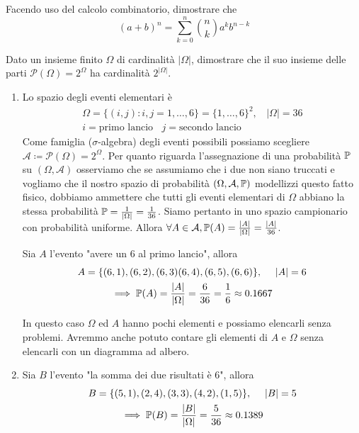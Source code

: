 \Esercizio{}

Facendo uso del calcolo combinatorio, dimostrare che
\begin{equation*}
	(a+b)^{n} =\sum\limits _{k=0}^{n}\binom{n}{k} a^{k} b^{n-k}
\end{equation*}

\Esercizio{}

Dato un insieme finito $\Omega $ di cardinalità $| \Omega | $, dimostrare che il suo insieme delle parti $\mathcal{P}(\Omega) =2^{\Omega }$ ha cardinalità $2^{| \Omega | }$.

\ParteSoluzioni

\Soluzione

\begin{enumerate}
	\item Lo spazio degli eventi elementari è
	\begin{gather*}
		\Omega =\{(i,j) :i,j=1,\dots ,6\} =\{1,\dots ,6\}^{2} ,\ \ \ \ | \Omega | =36\\
		i=\text{primo lancio} \ \ \ \ j=\text{secondo lancio}
	\end{gather*}
	Come famiglia ($\sigma $-algebra) degli eventi possibili possiamo scegliere $\mathcal{A} \coloneqq \mathcal{P}(\Omega) =2^{\Omega }$. Per quanto riguarda l'assegnazione di una probabilità $\mathbb{P}$ su $(\Omega ,\mathcal{A})$ osserviamo che se assumiamo che i due non siano truccati e vogliamo che il nostro spazio di probabilità $(\Omega ,\mathcal{A} ,\mathbb{P})$ modellizzi questo fatto fisico, dobbiamo ammettere che tutti gli eventi elementari di $\Omega $ abbiano la stessa probabilità $\mathbb{P} =\frac{1}{| \Omega | } =\frac{1}{36}$. Siamo pertanto in uno spazio campionario con probabilità uniforme. Allora $\forall A\in \mathcal{A} ,\mathbb{P}(A) =\frac{| A| }{| \Omega | } =\frac{| A| }{36}$.

	Sia $A$ l'evento "avere un $6$ al primo lancio", allora
	\begin{gather*}
		A=\{(6,1) ,(6,2) ,(6,3)(6,4) ,(6,5) ,(6,6)\} ,\ \ \ \ | A| =6\\
		\implies \mathbb{P}(A) =\frac{| A| }{| \Omega | } =\frac{6}{36} =\frac{1}{6} \approx 0.1667
	\end{gather*}

	\begin{oss}
		In questo caso $\Omega $ ed $A$ hanno pochi elementi e possiamo elencarli senza problemi. Avremmo anche potuto contare gli elementi di $A$ e $\Omega $ senza elencarli con un diagramma ad albero.
	\end{oss}

	\item Sia $B$ l'evento "la somma dei due risultati è $6$", allora
	\begin{gather*}
		B=\{(5,1) ,(2,4) ,(3,3) ,(4,2) ,(1,5)\} ,\ \ \ \ | B| =5\\
		\implies \mathbb{P}(B) =\frac{| B| }{| \Omega | } =\frac{5}{36} \approx 0.1389
	\end{gather*}


\end{enumerate}
